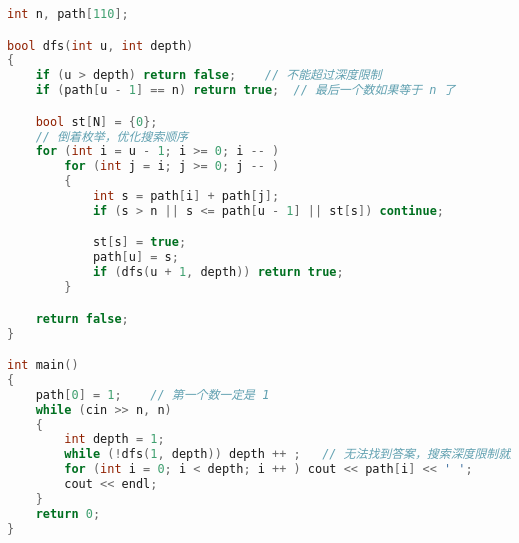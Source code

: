 \begin{lstlisting}[language=cpp]
int n, path[110];

bool dfs(int u, int depth)
{
    if (u > depth) return false;    // 不能超过深度限制
    if (path[u - 1] == n) return true;  // 最后一个数如果等于 n 了

    bool st[N] = {0};
    // 倒着枚举，优化搜索顺序
    for (int i = u - 1; i >= 0; i -- )
        for (int j = i; j >= 0; j -- )
        {
            int s = path[i] + path[j];
            if (s > n || s <= path[u - 1] || st[s]) continue;

            st[s] = true;
            path[u] = s;
            if (dfs(u + 1, depth)) return true;
        }

    return false;
}

int main()
{
    path[0] = 1;    // 第一个数一定是 1
    while (cin >> n, n)
    {
        int depth = 1;
        while (!dfs(1, depth)) depth ++ ;   // 无法找到答案，搜索深度限制就加一
        for (int i = 0; i < depth; i ++ ) cout << path[i] << ' ';
        cout << endl;
    }
    return 0;
}
\end{lstlisting}